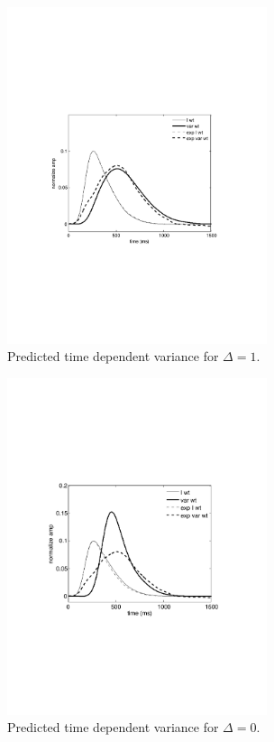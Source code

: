 \documentclass[12pt]{article}
\begin{document}
\begin{figure}[h]
\begin{center}
\includegraphics[width=3in]{wt-delta1.pdf}
\caption{Predicted time dependent variance for $\Delta = 1$.}
\label{fig:delta1}
\end{center}
\end{figure}

\begin{figure}[h]
\begin{center}
\includegraphics[width=3in]{wt-delta0.pdf}
\caption{Predicted time dependent variance for $\Delta = 0$.}
\label{fig:delta0}
\end{center}
\end{figure}
\end{document}
